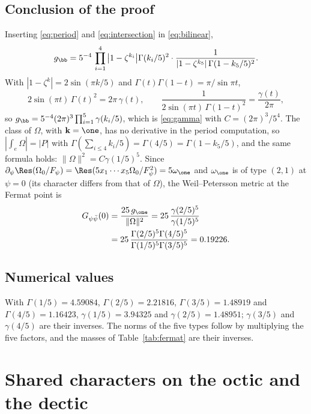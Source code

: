 \subsection{Conclusion of the proof}

Inserting \eqref{eq:period} and \eqref{eq:intersection} in
\eqref{eq:bilinear},
\[
g_{\bb}=5^{-4}\,\prod_{i=1}^4\big|1-\zeta^{k_i}\big|\Gamma(k_i/5)^2\cdot
\frac{1}{|1-\zeta^{k_5}|\,\Gamma(1-k_5/5)^2}.
\]
With $|1-\zeta^k|=2\sin(\pi k/5)$ and $\Gamma(t)\Gamma(1-t)=\pi/\sin\pi t$,
\[
2\sin(\pi t)\,\Gamma(t)^2=2\pi\,\gamma(t),\qquad
\frac{1}{2\sin(\pi t)\,\Gamma(1-t)^2}=\frac{\gamma(t)}{2\pi},
\]
so $g_{\bb}=5^{-4}(2\pi)^3\prod_{i=1}^5\gamma(k_i/5)$, which is
\eqref{eq:gamma} with $C=(2\pi)^3/5^4$. The class of $\Omega$, with
$\mathbf k=\one$, has no derivative in the period computation, so
$|\int_e\Omega|=|P|$ with $\Gamma(\sum_{i\le4}k_i/5)=\Gamma(4/5)=
\Gamma(1-k_5/5)$, and the same formula holds: $\|\Omega\|^2=C\gamma(1/5)^5$.
Since $\partial_\psi\Res(\Omega_0/F_\psi)=\Res(5x_1\cdots x_5\Omega_0/
F_\psi^2)=5\omega_{\one}$ and $\omega_{\one}$ is of type $(2,1)$ at
$\psi=0$ (its character differs from that of $\Omega$), the
Weil--Petersson metric at the Fermat point is
\begin{align*}
G_{\psi\bar\psi}(0)&=\frac{25\,g_{\one}}{\|\Omega\|^2}
=25\,\frac{\gamma(2/5)^5}{\gamma(1/5)^5}\\
&=25\,\frac{\Gamma(2/5)^5\Gamma(4/5)^5}{\Gamma(1/5)^5\Gamma(3/5)^5}=0.19226.
\end{align*}

\subsection{Numerical values}

With $\Gamma(1/5)=4.59084$, $\Gamma(2/5)=2.21816$, $\Gamma(3/5)=1.48919$
and $\Gamma(4/5)=1.16423$, $\gamma(1/5)=3.94325$ and $\gamma(2/5)=1.48951$;
$\gamma(3/5)$ and $\gamma(4/5)$ are their inverses. The norms of the
five types follow by multiplying the five factors, and the masses of
Table~\ref{tab:fermat} are their inverses.

\section{Shared characters on the octic and the dectic}\label{app:wlabels}

